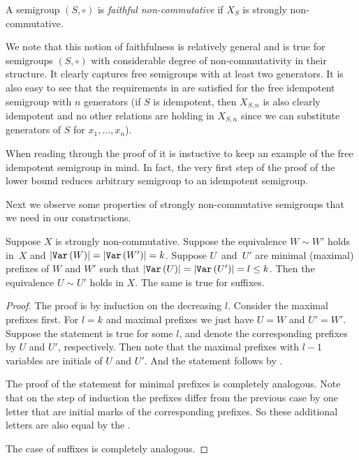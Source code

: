 \documentclass{toc}
\begin{document}
\begin{definition}
	\label{def:faithful}
	A semigroup $(S, \circ)$ is \emph{faithful non-commutative} if $X_S$ is strongly
	non-commutative.
\end{definition}

We note that this notion of faithfulness is relatively general and is true for
semigroups $(S,\circ)$ with considerable degree of non-commutativity in their
structure. It clearly captures free semigroups with at least two generators. It
is also easy to see that the
requirements in  are satisfied for the free
idempotent semigroup with $n$ generators (if $S$ is idempotent, then $X_{S,n}$
is also clearly idempotent and no other relations are holding in $X_{S,n}$ since
we can substitute generators of $S$ for $x_1, \ldots, x_n$).

When reading through the proof of  it is instuctive to keep an example of the free idempotent semigroup in mind. In fact, the very first step of the proof of the lower bound reduces arbitrary semigroup to an idempotent semigroup.

Next we observe some properties of strongly non-commutative semigroups that we
need in our constructions.


\begin{lemma} \label{lem:prefix_equivalence}
Suppose $X$ is strongly non-commutative. Suppose the equivalence $W \sim W'$
holds in~$X$ and $|\texttt{Var}\,(W)|=|\texttt{Var}\,(W')|=k$. Suppose $U$~and~$U'$ are minimal
(maximal) prefixes of $W$ and $W'$ such that $|\texttt{Var}\,(U)| = |\texttt{Var}\,(U')| = l\leq k$.
Then the equivalence $U \sim U'$ holds in $X$. The same is true for suffixes.
\end{lemma}

\begin{proof}
The proof is by induction on the decreasing $l$. Consider the maximal prefixes
first. For $l=k$ and maximal prefixes we just have $U=W$ and $U'=W'$. Suppose
the statement is true for some $l$, and denote the corresponding prefixes by $U$
and $U'$, respectively. Then note that the maximal prefixes with $l-1$ variables
are initials of $U$ and $U'$. And the statement follows by
.

The proof of the statement for minimal prefixes is completely analogous. Note
that on the step of induction the prefixes differ from the previous case by one
letter that are initial marks of the corresponding prefixes. So these additional
letters are also equal by the .

The case of suffixes is completely analogous.
\end{proof}
\end{document}
